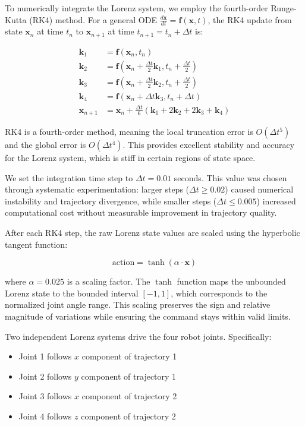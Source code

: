 \documentclass[12pt,a4paper,oneside]{report}
\begin{document}
To numerically integrate the Lorenz system, we employ the fourth-order Runge-Kutta (RK4) method. For a general ODE $\frac{d\mathbf{x}}{dt} = \mathbf{f}(\mathbf{x}, t)$, the RK4 update from state $\mathbf{x}_n$ at time $t_n$ to $\mathbf{x}_{n+1}$ at time $t_{n+1} = t_n + \Delta t$ is:

\begin{align}
\mathbf{k}_1 &= \mathbf{f}(\mathbf{x}_n, t_n) \\
\mathbf{k}_2 &= \mathbf{f}(\mathbf{x}_n + \frac{\Delta t}{2}\mathbf{k}_1, t_n + \frac{\Delta t}{2}) \\
\mathbf{k}_3 &= \mathbf{f}(\mathbf{x}_n + \frac{\Delta t}{2}\mathbf{k}_2, t_n + \frac{\Delta t}{2}) \\
\mathbf{k}_4 &= \mathbf{f}(\mathbf{x}_n + \Delta t \mathbf{k}_3, t_n + \Delta t) \\
\mathbf{x}_{n+1} &= \mathbf{x}_n + \frac{\Delta t}{6}(\mathbf{k}_1 + 2\mathbf{k}_2 + 2\mathbf{k}_3 + \mathbf{k}_4)
\end{align}

RK4 is a fourth-order method, meaning the local truncation error is $O(\Delta t^5)$ and the global error is $O(\Delta t^4)$. This provides excellent stability and accuracy for the Lorenz system, which is stiff in certain regions of state space.

We set the integration time step to $\Delta t = 0.01$ seconds. This value was chosen through systematic experimentation: larger steps ($\Delta t \geq 0.02$) caused numerical instability and trajectory divergence, while smaller steps ($\Delta t \leq 0.005$) increased computational cost without measurable improvement in trajectory quality.

After each RK4 step, the raw Lorenz state values are scaled using the hyperbolic tangent function:

\begin{equation}
\text{action} = \tanh(\alpha \cdot \mathbf{x})
\end{equation}

where $\alpha = 0.025$ is a scaling factor. The $\tanh$ function maps the unbounded Lorenz state to the bounded interval $[-1, 1]$, which corresponds to the normalized joint angle range. This scaling preserves the sign and relative magnitude of variations while ensuring the command stays within valid limits.

Two independent Lorenz systems drive the four robot joints. Specifically:

\begin{itemize}
    \item Joint 1 follows $x$ component of trajectory 1
    \item Joint 2 follows $y$ component of trajectory 1
    \item Joint 3 follows $x$ component of trajectory 2
    \item Joint 4 follows $z$ component of trajectory 2
\end{itemize}
\end{document}

